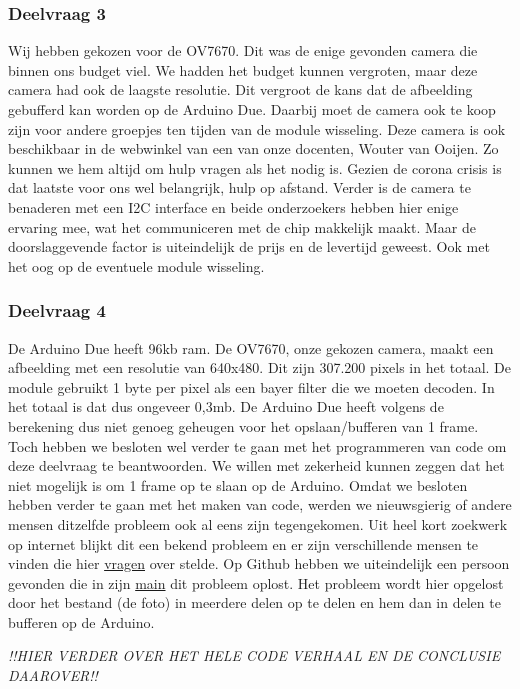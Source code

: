 \documentclass{article}
\begin{document}
\subsubsection{Deelvraag 3}
Wij hebben gekozen voor de OV7670. Dit was de enige gevonden camera die binnen ons budget viel. We hadden het budget kunnen vergroten, maar deze camera had ook de laagste resolutie. Dit vergroot de kans dat de afbeelding gebufferd kan worden op de Arduino Due. Daarbij moet de camera ook te koop zijn voor andere groepjes ten tijden van de module wisseling.  Deze camera is ook beschikbaar in de webwinkel van een van onze docenten, Wouter van Ooijen. Zo kunnen we hem altijd om hulp vragen als het nodig is. Gezien de corona crisis is dat laatste voor ons wel belangrijk, hulp op afstand. Verder is de camera te benaderen met een I2C interface en beide onderzoekers hebben hier enige ervaring mee, wat het communiceren met de chip makkelijk maakt. Maar de doorslaggevende factor is uiteindelijk de prijs en de levertijd geweest. Ook met het oog op de eventuele module wisseling.

\subsubsection{Deelvraag 4}
De Arduino Due heeft 96kb ram. De OV7670, onze gekozen camera, maakt een afbeelding met een resolutie van 640x480. Dit zijn 307.200 pixels in het totaal. De module gebruikt 1 byte per pixel als een bayer filter die we moeten decoden. In het totaal is dat dus ongeveer 0,3mb. De Arduino Due heeft volgens de berekening dus niet genoeg geheugen voor het opslaan/bufferen van 1 frame.
Toch hebben we besloten wel verder te gaan met het programmeren van code om deze deelvraag te beantwoorden. We willen met zekerheid kunnen zeggen dat het niet mogelijk is om 1 frame op te slaan op de Arduino. 
Omdat we besloten hebben verder te gaan met het maken van code, werden we nieuwsgierig of andere mensen ditzelfde probleem ook al eens zijn tegengekomen. Uit heel kort zoekwerk op internet blijkt dit een bekend probleem en er zijn verschillende mensen te vinden die hier \href{https://forum.arduino.cc/index.php?topic=159557.0}{vragen} over stelde. Op Github hebben we uiteindelijk een persoon gevonden die in zijn \href{https://github.com/ComputerNerd/ov7670-simple/blob/master/main.c}{main}  dit probleem oplost. Het probleem wordt hier opgelost door het bestand (de foto) in meerdere delen op te delen en hem dan in delen te bufferen op de Arduino. 

\textit{!!HIER VERDER OVER HET HELE CODE VERHAAL EN DE CONCLUSIE DAAROVER!!}
\end{document}
